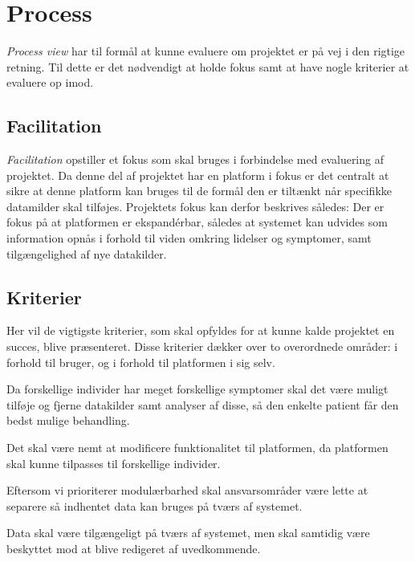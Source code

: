 \section{Process}\label{sec:process}
\emph{Process view} har til formål at kunne evaluere om projektet er på vej i den rigtige retning. 
Til dette er det nødvendigt at holde fokus samt at have nogle kriterier at evaluere op imod.

\subsection{Facilitation}
\emph{Facilitation} opstiller et fokus som skal bruges i forbindelse med evaluering af projektet.
Da denne del af projektet har en platform i fokus er det centralt at sikre at denne platform kan bruges til de formål den er tiltænkt når specifikke datamilder skal tilføjes.
Projektets fokus kan derfor beskrives således:
Der er fokus på at platformen er ekspandérbar, således at systemet kan udvides som information opnås i forhold til viden omkring lidelser og symptomer, samt tilgængelighed af nye datakilder.

\subsection{Kriterier}\label{firstsubseckriterier}
Her vil de vigtigste kriterier, som skal opfyldes for at kunne kalde projektet en succes, blive præsenteret.
Disse kriterier dækker over to overordnede områder: i forhold til bruger, og i forhold til platformen i sig selv.

\begin{description}[style=nextline]
	\item[Modulær] 
	Da forskellige individer har meget forskellige symptomer skal det være muligt tilføje og fjerne datakilder samt analyser af disse, så den enkelte patient får den bedst mulige behandling.
	\item[Fleksibilitet]
	Det skal være nemt at modificere funktionalitet til platformen, da platformen skal kunne tilpasses til forskellige individer.
	\item[Kombinerbar] Eftersom vi prioriterer modulærbarhed skal ansvarsområder være lette at separere så indhentet data kan bruges på tværs af systemet.
	\item[Kommunikation] Data skal være tilgængeligt på tværs af systemet, men skal samtidig være beskyttet mod at blive redigeret af uvedkommende.
\end{description}
